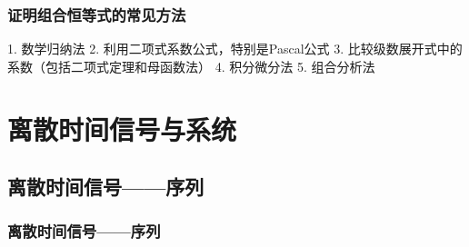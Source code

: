 \documentclass[cn, hazy, blue, normal, 12pt]{elegantnote}
\begin{document}
\subsubsection{证明组合恒等式的常见方法}

1. 数学归纳法
2. 利用二项式系数公式，特别是Pascal公式
3. 比较级数展开式中的系数（包括二项式定理和母函数法）
4. 积分微分法
5. 组合分析法

\section{离散时间信号与系统}

\subsection{离散时间信号——序列}

\subsubsection{离散时间信号——序列}
\end{document}

